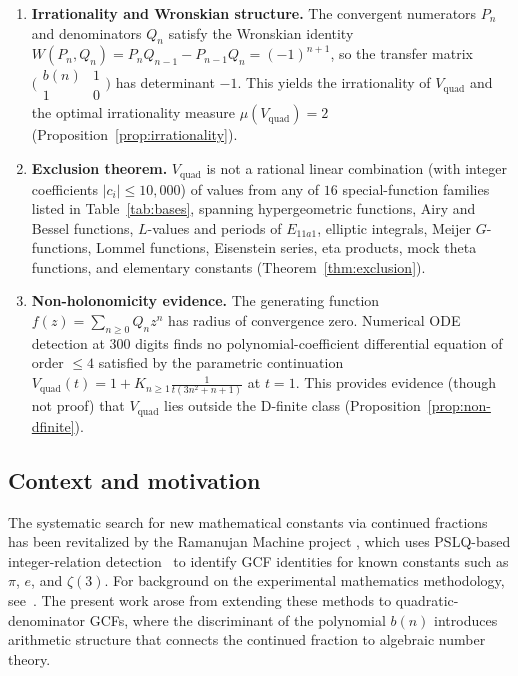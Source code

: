 \documentclass[11pt,a4paper]{article}
\theoremstyle{definition}
\theoremstyle{remark}
\newcommand{\Vq}{V_{\mathrm{quad}}}
\newcommand{\abs}[1]{\lvert #1 \rvert}
\begin{document}
\begin{enumerate}
\item \textbf{Irrationality and Wronskian structure.}
  The convergent numerators $P_n$ and denominators $Q_n$ satisfy the
  Wronskian identity $W(P_n, Q_n) = P_n Q_{n-1} - P_{n-1} Q_n = (-1)^{n+1}$,
  so the transfer matrix
  $\bigl(\begin{smallmatrix} b(n) & 1 \\ 1 & 0 \end{smallmatrix}\bigr)$
  has determinant $-1$.
  This yields the irrationality of $\Vq$ and the optimal irrationality
  measure $\mu(\Vq) = 2$ (Proposition~\ref{prop:irrationality}).

\item \textbf{Exclusion theorem.}
  $\Vq$ is not a rational linear combination (with integer coefficients
  $\abs{c_i} \le 10{,}000$) of values from any of $16$ special-function
  families listed in Table~\ref{tab:bases}, spanning hypergeometric
  functions, Airy and Bessel functions, $L$-values and periods of
  $E_{11a1}$, elliptic integrals, Meijer $G$-functions, Lommel
  functions, Eisenstein series, eta products, mock theta functions,
  and elementary constants
  (Theorem~\ref{thm:exclusion}).

\item \textbf{Non-holonomicity evidence.}
  The generating function $f(z) = \sum_{n \ge 0} Q_n z^n$ has radius
  of convergence zero.  Numerical ODE detection at 300 digits finds no
  polynomial-coefficient differential equation of order $\le 4$
  satisfied by the parametric continuation $\Vq(t) = 1 + K_{n \ge 1}
  \frac{1}{t(3n^2+n+1)}$ at $t = 1$.  This provides evidence (though
  not proof) that $\Vq$ lies outside the D-finite class
  (Proposition~\ref{prop:non-dfinite}).
\end{enumerate}


\subsection{Context and motivation}

The systematic search for new mathematical constants via continued
fractions has been revitalized by the Ramanujan Machine project
\cite{raayoni2021}, which uses PSLQ-based integer-relation
detection~\cite{ferguson1999}
to identify GCF identities for known constants such as $\pi$, $e$,
and $\zeta(3)$.  For background on the experimental mathematics
methodology, see~\cite{borwein2004}.
The present work arose from extending these methods
to quadratic-denominator GCFs, where the discriminant of the
polynomial $b(n)$ introduces arithmetic structure that connects
the continued fraction to algebraic number theory.
\end{document}
